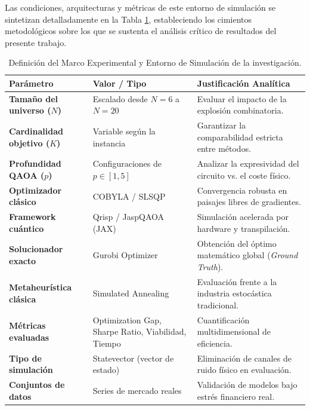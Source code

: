 Las condiciones, arquitecturas y métricas de este entorno de simulación se sintetizan detalladamente en la Tabla \ref{tab:marco_experimental}, estableciendo los cimientos metodológicos sobre los que se sustenta el análisis crítico de resultados del presente trabajo.

\begin{table}[htbp]
    \centering
    \caption{Definición del Marco Experimental y Entorno de Simulación de la investigación.}
    \label{tab:marco_experimental}
    \begin{tabular}{p{4cm}p{4.5cm}p{6cm}}
        \toprule
        \textbf{Parámetro} & \textbf{Valor / Tipo} & \textbf{Justificación Analítica} \\
        \midrule
        \textbf{Tamaño del universo ($N$)} & Escalado desde $N=6$ a $N=20$ & Evaluar el impacto de la explosión combinatoria. \\
        \addlinespace
        \textbf{Cardinalidad objetivo ($K$)} & Variable según la instancia & Garantizar la comparabilidad estricta entre métodos. \\
        \addlinespace
        \textbf{Profundidad QAOA ($p$)} & Configuraciones de $p \in [1, 5]$ & Analizar la expresividad del circuito vs. el coste físico. \\
        \addlinespace
        \textbf{Optimizador clásico} & COBYLA / SLSQP & Convergencia robusta en paisajes libres de gradientes. \\
        \addlinespace
        \textbf{Framework cuántico} & Qrisp / JaspQAOA (JAX) & Simulación acelerada por hardware y transpilación. \\
        \addlinespace
        \textbf{Solucionador exacto} & Gurobi Optimizer & Obtención del óptimo matemático global (\textit{Ground Truth}). \\
        \addlinespace
        \textbf{Metaheurística clásica} & Simulated Annealing & Evaluación frente a la industria estocástica tradicional. \\
        \addlinespace
        \textbf{Métricas evaluadas} & Optimization Gap, Sharpe Ratio, Viabilidad, Tiempo & Cuantificación multidimensional de eficiencia. \\
        \addlinespace
        \textbf{Tipo de simulación} & Statevector (vector de estado) & Eliminación de canales de ruido físico en evaluación. \\
        \addlinespace
        \textbf{Conjuntos de datos} & Series de mercado reales & Validación de modelos bajo estrés financiero real. \\
        \bottomrule
    \end{tabular}
\end{table}